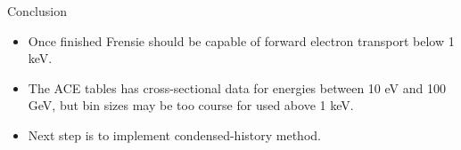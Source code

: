 \documentclass{beamer}
\begin{document}
\begin{frame}{Conclusion}

  \begin{itemize}
    \item Once finished Frensie should be capable of forward electron transport below 1 keV.
    \item The ACE tables has cross-sectional data for energies between 10 eV and 
            100 GeV, but bin sizes may be too course for used above 1 keV.
    \item Next step is to implement condensed-history method.
  \end{itemize}

\end{frame}
\end{document}
